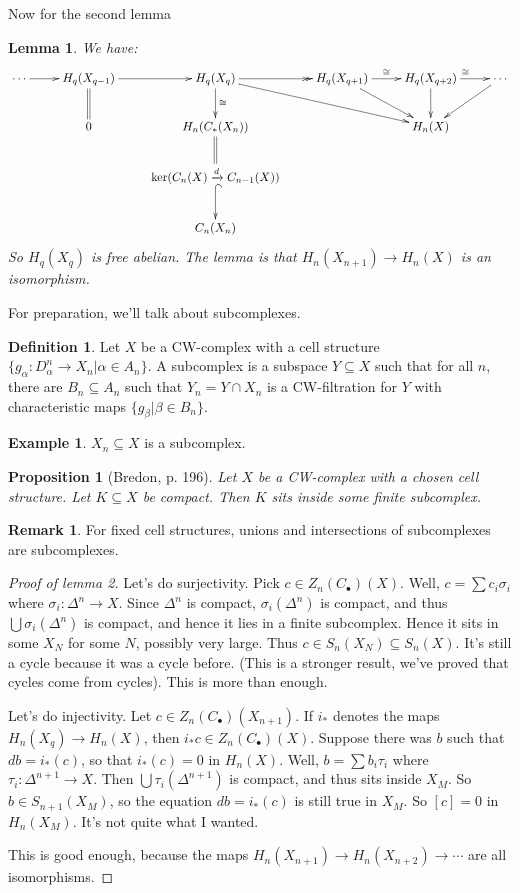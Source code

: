 \documentclass{amsart}
\theoremstyle{theorem}
\newtheorem{prop}[theorem]{Proposition}
\newtheorem{lemma}[theorem]{Lemma}
\theoremstyle{definition}
\newtheorem{definition}[theorem]{Definition}
\newtheorem{remark}[theorem]{Remark}
\newtheorem{example}[theorem]{Example}
\begin{document}
Now for the second lemma
\begin{lemma}
We have:
\begin{equation*}
\xymatrix{\ar[r]\cdots & H_q(X_{q-1})\ar[r]\ar@{=}[d] & H_q(X_q)\ar@{->>}[r]\ar[d]^\cong\ar[drr] & H_q(X_{q+1})\ar[r]^\cong\ar[dr] & H_q(X_{q+2})\ar[d]\ar[r]^\cong & \cdots\ar[dl]\\
& 0 & H_n(C_\ast(X_n))\ar@{=}[d] & & H_n(X) \\
& & \ker(C_n(X)\xrightarrow{d}C_{n-1}(X))\ar@{^(->}[d] & &\\
& & C_n(X_n) & &}
\end{equation*}
So $ H_q(X_q)$ is free abelian. The lemma is that $ H_n(X_{n+1})\to H_n(X)$ is an isomorphism.
\end{lemma}
For preparation, we'll talk about subcomplexes.
\begin{definition}
Let $X$ be a CW-complex with a cell structure $\{g_\alpha:D^n_\alpha\to X_n|\alpha\in A_n\}$. A subcomplex is a subspace $Y\subseteq X$ such that for all $n$, there are $B_n\subseteq A_n$ such that $Y_n=Y\cap X_n$ is a CW-filtration for $Y$ with characteristic maps $\{g_\beta|\beta\in B_n\}$.
\end{definition}
\begin{example}
$X_n\subseteq X$ is a subcomplex.
\end{example}
\begin{prop}[Bredon, p. 196]
Let $X$ be a CW-complex with a chosen cell structure. Let $K\subseteq X$ be compact. Then $K$ sits inside some finite subcomplex. 
\end{prop}
\begin{remark}
For fixed cell structures, unions and intersections of subcomplexes are subcomplexes.
\end{remark}
\begin{proof}[Proof of lemma 2]
Let's do surjectivity. Pick $c\in Z_n(C_\bullet)(X)$. Well, $c=\sum c_i\sigma_i$ where $\sigma_i:\Delta^n\to X$. Since $\Delta^n$ is compact, $\sigma_i(\Delta^n)$ is compact, and thus $\bigcup\sigma_i(\Delta^n)$ is compact, and hence it lies in a finite subcomplex. Hence it sits in some $X_N$ for some $N$, possibly very large. Thus $c\in S_n(X_N)\subseteq S_n(X)$. It's still a cycle because it was a cycle before. (This is a stronger result, we've proved that cycles come from cycles). This is more than enough.

Let's do injectivity. Let $c\in Z_n(C_\bullet)(X_{n+1})$. If $i_\ast$ denotes the maps $ H_n(X_q)\to H_n(X)$, then $i_\ast c\in Z_n(C_\bullet)(X)$. Suppose there was $b$ such that $db=i_\ast(c)$, so that $i_\ast(c)=0$ in $ H_n(X)$. Well, $b=\sum b_i \tau_i$ where $\tau_i:\Delta^{n+1}\to X$. Then $\bigcup \tau_i(\Delta^{n+1})$ is compact, and thus sits inside $X_M$. So $b\in S_{n+1}(X_M)$, so the equation $db=i_\ast(c)$ is still true in $X_M$. So $[c]=0$ in $ H_n(X_M)$. It's not quite what I wanted.

This is good enough, because the maps $ H_n(X_{n+1})\to H_n(X_{n+2})\to \cdots$ are all isomorphisms.
\end{proof}
\end{document}
